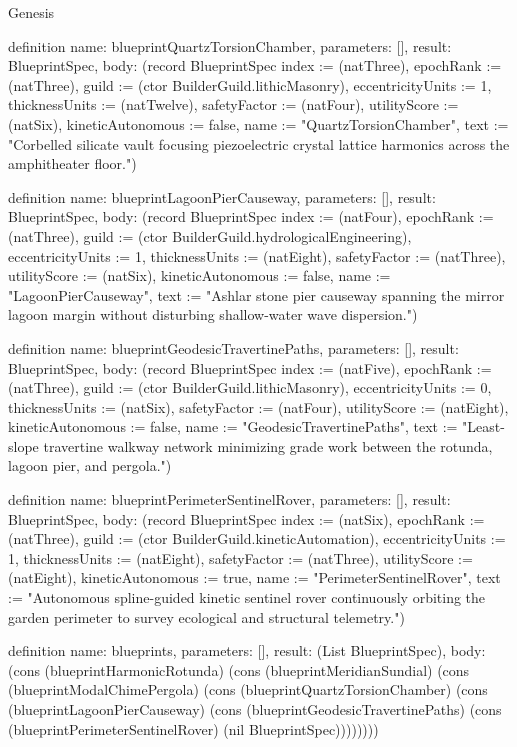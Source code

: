 \begin{lexlean}{Genesis}
\begin{semanticmodule}
definition{
  name: blueprintQuartzTorsionChamber,
  parameters: [],
  result: BlueprintSpec,
  body: (record BlueprintSpec {index := (natThree), epochRank := (natThree), guild := (ctor BuilderGuild.lithicMasonry), eccentricityUnits := 1, thicknessUnits := (natTwelve), safetyFactor := (natFour), utilityScore := (natSix), kineticAutonomous := false, name := "QuartzTorsionChamber", text := "Corbelled silicate vault focusing piezoelectric crystal lattice harmonics across the amphitheater floor."})
}

definition{
  name: blueprintLagoonPierCauseway,
  parameters: [],
  result: BlueprintSpec,
  body: (record BlueprintSpec {index := (natFour), epochRank := (natThree), guild := (ctor BuilderGuild.hydrologicalEngineering), eccentricityUnits := 1, thicknessUnits := (natEight), safetyFactor := (natThree), utilityScore := (natSix), kineticAutonomous := false, name := "LagoonPierCauseway", text := "Ashlar stone pier causeway spanning the mirror lagoon margin without disturbing shallow-water wave dispersion."})
}

definition{
  name: blueprintGeodesicTravertinePaths,
  parameters: [],
  result: BlueprintSpec,
  body: (record BlueprintSpec {index := (natFive), epochRank := (natThree), guild := (ctor BuilderGuild.lithicMasonry), eccentricityUnits := 0, thicknessUnits := (natSix), safetyFactor := (natFour), utilityScore := (natEight), kineticAutonomous := false, name := "GeodesicTravertinePaths", text := "Least-slope travertine walkway network minimizing grade work between the rotunda, lagoon pier, and pergola."})
}

definition{
  name: blueprintPerimeterSentinelRover,
  parameters: [],
  result: BlueprintSpec,
  body: (record BlueprintSpec {index := (natSix), epochRank := (natThree), guild := (ctor BuilderGuild.kineticAutomation), eccentricityUnits := 1, thicknessUnits := (natEight), safetyFactor := (natThree), utilityScore := (natEight), kineticAutonomous := true, name := "PerimeterSentinelRover", text := "Autonomous spline-guided kinetic sentinel rover continuously orbiting the garden perimeter to survey ecological and structural telemetry."})
}

definition{
  name: blueprints,
  parameters: [],
  result: (List BlueprintSpec),
  body: (cons (blueprintHarmonicRotunda) (cons (blueprintMeridianSundial) (cons (blueprintModalChimePergola) (cons (blueprintQuartzTorsionChamber) (cons (blueprintLagoonPierCauseway) (cons (blueprintGeodesicTravertinePaths) (cons (blueprintPerimeterSentinelRover) (nil BlueprintSpec))))))))
}


\end{semanticmodule}
\end{lexlean}
